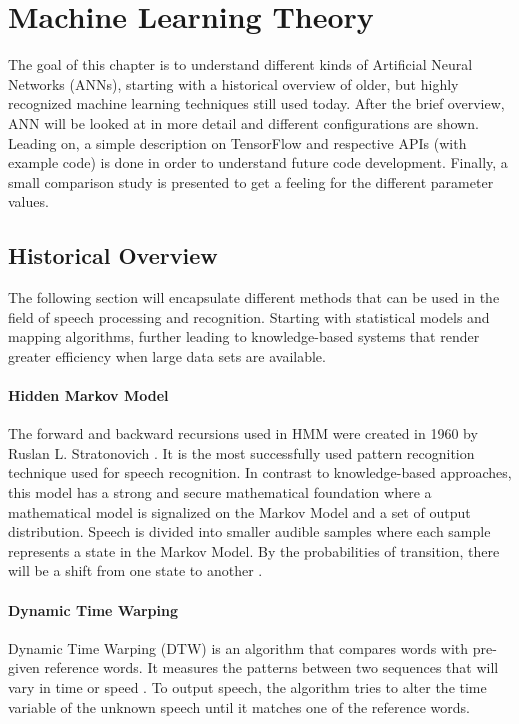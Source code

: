 \chapter{Machine Learning Theory}\label{ch:machine_learning}
The goal of this chapter is to understand different kinds of Artificial Neural Networks (ANNs), starting with a historical overview of older, but highly recognized machine learning techniques still used today. After the brief overview, ANN will be looked at in more detail and different configurations are shown. Leading on, a simple description on TensorFlow and respective APIs (with example code) is done in order to understand future code development. Finally, a small comparison study is presented to get a feeling for the different parameter values.

\section{Historical Overview}
The following section will encapsulate different methods that 
can be used in the field of speech processing and recognition.
Starting with statistical models and mapping algorithms,
further leading to knowledge-based systems that render greater
efficiency when large data sets are available.

\subsubsection{Hidden Markov Model}

The forward and backward recursions used in HMM  
were created in 1960
by Ruslan L. Stratonovich \cite{stratonovich1960conditional}.
It is the most successfully used pattern recognition technique used for speech recognition.
In contrast to knowledge-based approaches, this model has
a strong and secure mathematical foundation
where a mathematical model is signalized on the Markov
Model and a set of output distribution. Speech is divided
into smaller audible samples where each sample represents a state in the Markov Model. 
By the probabilities of transition, there will be a shift from one state to another
\cite[p.~2]{gaikwad2010review}\cite{togneri1990speech}.

\subsubsection{Dynamic Time Warping}

Dynamic Time Warping (DTW) is an algorithm that compares words with pre-given reference words.
It measures the patterns between two sequences that will vary in time or speed \cite{togneri1990speech}.
To output speech, the algorithm tries to alter the time variable of the unknown speech until it matches one of the reference words.

